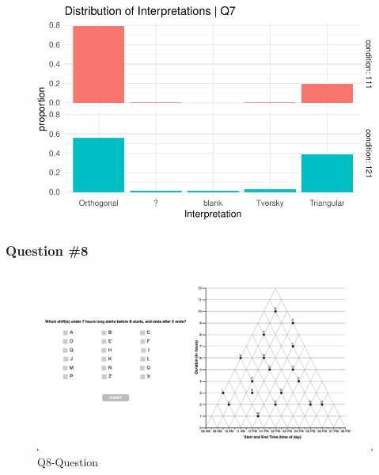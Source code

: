 \documentclass[
  letterpaper,
  DIV=11,
  numbers=noendperiod]{scrreprt}
\begin{document}
\begin{figure}[H]

{\centering \includegraphics{analysis/SGC3A/2_sgc3A_scoring_files/figure-pdf/Q7-distribution-2.pdf}

}

\end{figure}

\hypertarget{question-8}{%
\subsubsection{Question \#8}\label{question-8}}

\begin{figure}

{\centering \includegraphics{analysis/SGC3A/static/questions/Q8.png}

}

\caption{\label{fig-Q8}Q8-Question}

\end{figure}
\end{document}
